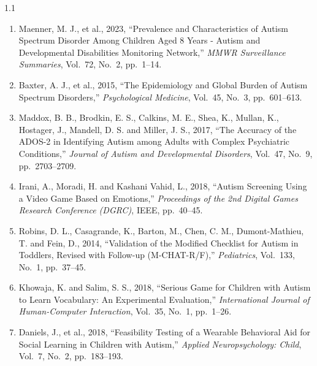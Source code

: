 \documentclass[12pt,a4paper,oneside]{report}
\begin{document}
	\begin{spacing}{1.1}
		\begin{enumerate}[leftmargin=0pt, itemindent=0pt, labelsep=0.5em,
			labelwidth=1.5em, itemsep=6pt, parsep=0pt,
			label={\arabic*.},
			ref={\arabic*},
			align=left]
			
			\setlength{\itemsep}{6pt}
			
			\item Maenner, M. J., et al., 2023, ``Prevalence and Characteristics of Autism Spectrum Disorder Among Children Aged 8 Years - Autism and Developmental Disabilities Monitoring Network,'' \textit{MMWR Surveillance Summaries}, Vol.~72, No.~2, pp.~1--14.
			
			\item Baxter, A. J., et al., 2015, ``The Epidemiology and Global Burden of Autism Spectrum Disorders,'' \textit{Psychological Medicine}, Vol.~45, No.~3, pp.~601--613.
			
			\item Maddox, B. B., Brodkin, E. S., Calkins, M. E., Shea, K., Mullan, K., Hostager, J., Mandell, D. S. and Miller, J. S., 2017, ``The Accuracy of the ADOS-2 in Identifying Autism among Adults with Complex Psychiatric Conditions,'' \textit{Journal of Autism and Developmental Disorders}, Vol.~47, No.~9, pp.~2703--2709.
			
			\item Irani, A., Moradi, H. and Kashani Vahid, L., 2018, ``Autism Screening Using a Video Game Based on Emotions,'' \textit{Proceedings of the 2nd Digital Games Research Conference (DGRC)}, IEEE, pp.~40--45.
			
			\item Robins, D. L., Casagrande, K., Barton, M., Chen, C. M., Dumont-Mathieu, T. and Fein, D., 2014, ``Validation of the Modified Checklist for Autism in Toddlers, Revised with Follow-up (M-CHAT-R/F),'' \textit{Pediatrics}, Vol.~133, No.~1, pp.~37--45.
			
			\item Khowaja, K. and Salim, S. S., 2018, ``Serious Game for Children with Autism to Learn Vocabulary: An Experimental Evaluation,'' \textit{International Journal of Human-Computer Interaction}, Vol.~35, No.~1, pp.~1--26.
			
			\item Daniels, J., et al., 2018, ``Feasibility Testing of a Wearable Behavioral Aid for Social Learning in Children with Autism,'' \textit{Applied Neuropsychology: Child}, Vol.~7, No.~2, pp.~183--193.
			

\end{enumerate}
\end{spacing}
\end{document}
